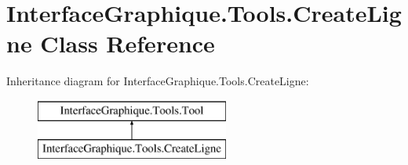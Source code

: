 \hypertarget{class_interface_graphique_1_1_tools_1_1_create_ligne}{}\section{Interface\+Graphique.\+Tools.\+Create\+Ligne Class Reference}
\label{class_interface_graphique_1_1_tools_1_1_create_ligne}
Inheritance diagram for Interface\+Graphique.\+Tools.\+Create\+Ligne\+:\begin{figure}[H]
\begin{center}
\leavevmode
\includegraphics[height=2.000000cm]{class_interface_graphique_1_1_tools_1_1_create_ligne}
\end{center}
\end{figure}

